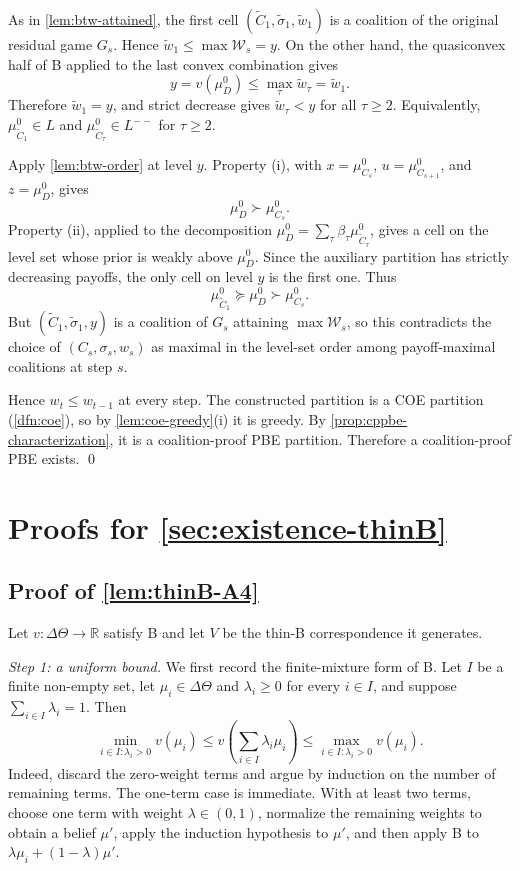 \documentclass[11pt]{article}
\newcommand{\W}{\mathcal{W}}
\begin{document}
As in \cref{lem:btw-attained}, the first cell $(\widetilde C_1,\widetilde\sigma_1,\widetilde w_1)$ is a coalition of the original residual game $G_s$. Hence $\widetilde w_1\leq\max\W_s=y$. On the other hand, the quasiconvex half of B applied to the last convex combination gives
\[
    y=v(\mu^0_D)\leq\max_\tau\widetilde w_\tau=\widetilde w_1.
\]
Therefore $\widetilde w_1=y$, and strict decrease gives $\widetilde w_\tau<y$ for all $\tau\geq2$. Equivalently, $\mu^0_{\widetilde C_1}\in L$ and $\mu^0_{\widetilde C_\tau}\in L^{--}$ for $\tau\geq2$.

Apply \cref{lem:btw-order} at level $y$. Property (i), with $x=\mu^0_{C_s}$, $u=\mu^0_{C_{s+1}}$, and $z=\mu^0_D$, gives
\[
    \mu^0_D\succ\mu^0_{C_s}.
\]
Property (ii), applied to the decomposition $\mu^0_D=\sum_\tau\beta_\tau\mu^0_{\widetilde C_\tau}$, gives a cell on the level set whose prior is weakly above $\mu^0_D$. Since the auxiliary partition has strictly decreasing payoffs, the only cell on level $y$ is the first one. Thus
\[
    \mu^0_{\widetilde C_1}\succeq\mu^0_D\succ\mu^0_{C_s}.
\]
But $(\widetilde C_1,\widetilde\sigma_1,y)$ is a coalition of $G_s$ attaining $\max\W_s$, so this contradicts the choice of $(C_s,\sigma_s,w_s)$ as maximal in the level-set order among payoff-maximal coalitions at step $s$.

Hence $w_t\leq w_{t-1}$ at every step. The constructed partition is a COE partition (\cref{dfn:coe}), so by \cref{lem:coe-greedy}(i) it is greedy. By \cref{prop:cppbe-characterization}, it is a coalition-proof PBE partition. Therefore a coalition-proof PBE exists.
\qed

\section{Proofs for \cref{sec:existence-thinB}}

\subsection*{Proof of \cref{lem:thinB-A4}}
Let $v:\Delta\Theta\to\mathbb{R}$ satisfy B and let $V$ be the thin-B correspondence it generates.

\emph{Step 1: a uniform bound.} We first record the finite-mixture form of B. Let $I$ be a finite non-empty set, let $\mu_i\in\Delta\Theta$ and $\lambda_i\geq0$ for every $i\in I$, and suppose $\sum_{i\in I}\lambda_i=1$. Then
\begin{equation}\label{eq:finite-B}
    \min_{i\in I:\lambda_i>0}v(\mu_i)
    \leq
    v\left(\sum_{i\in I}\lambda_i\mu_i\right)
    \leq
    \max_{i\in I:\lambda_i>0}v(\mu_i).
\end{equation}
Indeed, discard the zero-weight terms and argue by induction on the number of remaining terms. The one-term case is immediate. With at least two terms, choose one term with weight $\lambda\in(0,1)$, normalize the remaining weights to obtain a belief $\mu'$, apply the induction hypothesis to $\mu'$, and then apply B to $\lambda\mu_i+(1-\lambda)\mu'$.
\end{document}
